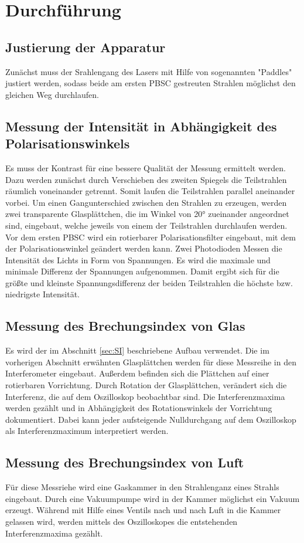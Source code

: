 \section{Durchführung}
\subsection{Justierung der Apparatur}
Zunächst muss der Srahlengang des Lasers mit Hilfe von sogenannten "Paddles" justiert werden,
sodass beide am ersten PBSC gestreuten Strahlen möglichst den gleichen Weg durchlaufen.

\subsection{Messung der Intensität in Abhängigkeit des Polarisationswinkels}
Es muss der Kontrast für eine bessere Qualität der Messung ermittelt werden.
Dazu werden zunächst durch Verschieben des zweiten Spiegels die Teilstrahlen räumlich voneinander getrennt.
Somit laufen die Teilstrahlen parallel aneinander vorbei.
Um einen Gangunterschied zwischen den Strahlen zu erzeugen,
werden zwei transparente Glasplättchen,
die im Winkel von 20° zueinander angeordnet sind,
eingebaut, welche jeweils von einem der Teilstrahlen durchlaufen werden.
Vor dem ersten PBSC wird ein rotierbarer Polarisationsfilter eingebaut,
mit dem der Polarisationswinkel geändert werden kann.
Zwei Photodioden Messen die Intensität des Lichts in Form von Spannungen.
Es wird die maximale und minimale Differenz der Spannungen aufgenommen.
Damit ergibt sich für die größte und kleinste Spannungsdifferenz der beiden Teilstrahlen
die höchste bzw. niedrigste Intensität.

\subsection{Messung des Brechungsindex von Glas}
Es wird der im Abschnitt \ref{sec:SI} beschriebene Aufbau verwendet.
Die im vorherigen Abschnitt erwähnten Glasplättchen werden für diese Messreihe in den Interferometer eingebaut.
Außerdem befinden sich die Plättchen auf einer rotierbaren Vorrichtung.
Durch Rotation der Glasplättchen, verändert sich die Interferenz, die auf dem Oszilloskop beobachtbar sind.
Die Interferenzmaxima werden gezählt und in Abhängigkeit des Rotationswinkels der Vorrichtung dokumentiert.
Dabei kann jeder aufsteigende Nulldurchgang auf dem Oszilloskop als Interferenzmaximum interpretiert werden.

\subsection{Messung des Brechungsindex von Luft}
Für diese Messriehe wird eine Gaskammer in den Strahlenganz eines Strahls eingebaut.
Durch eine Vakuumpumpe wird in der Kammer möglichst ein Vakuum erzeugt.
Während mit Hilfe eines Ventils nach und nach Luft in die Kammer gelassen wird,
werden mittels des Oszilloskopes die entstehenden Interferenzmaxima gezählt.
